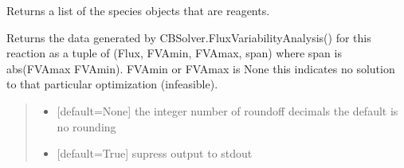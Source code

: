 \documentclass[letterpaper,12pt,english]{sphinxmanual}
\begin{document}
\begin{fulllineitems}
\begin{fulllineitems}
\end{fulllineitems}


\begin{fulllineitems}
\label{\detokenize{api/core:cbmpy.CBModel.Reaction.getSpeciesObj}}
\pysigstartsignatures
\pysiglinewithargsret
{}
{}
{}
\pysigstopsignatures
\sphinxAtStartPar
Returns a list of the species objects that are reagents.

\end{fulllineitems}


\begin{fulllineitems}
\label{\detokenize{api/core:cbmpy.CBModel.Reaction.getFVAdata}}
\pysigstartsignatures
\pysiglinewithargsret
{}
{\sphinxparamcomma {}}
{}
\pysigstopsignatures
\sphinxAtStartPar
Returns the data generated by CBSolver.FluxVariabilityAnalysis() for this reaction as a tuple of (Flux, FVAmin, FVAmax, span) where span is abs(FVAmax \sphinxhyphen{} FVAmin). FVAmin or FVAmax is None this indicates no solution to that particular optimization (infeasible).
\begin{quote}\begin{description}
\begin{itemize}
\item {} 
\sphinxAtStartPar
{} \textendash{} {[}default=None{]} the integer number of roundoff decimals the default is no rounding

\item {} 
\sphinxAtStartPar
{} \textendash{} {[}default=True{]} supress output to stdout

\end{itemize}

\end{description}\end{quote}

\end{fulllineitems}


\end{fulllineitems}
\end{document}
